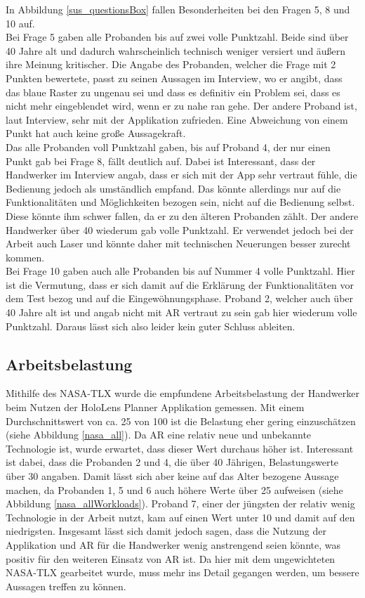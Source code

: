 In Abbildung \ref{sus_questionsBox} fallen Besonderheiten bei den Fragen 5, 8 und 10 auf. \\
Bei Frage 5 gaben alle Probanden bis auf zwei volle Punktzahl. Beide sind über 40 Jahre alt und dadurch wahrscheinlich technisch weniger versiert und äußern ihre Meinung kritischer. Die Angabe des Probanden, welcher die Frage mit 2 Punkten bewertete, passt zu seinen Aussagen im Interview, wo er angibt, dass das blaue Raster zu ungenau sei und dass es definitiv ein Problem sei, dass es nicht mehr eingeblendet wird, wenn er zu nahe ran gehe. Der andere Proband ist, laut Interview, sehr mit der Applikation zufrieden. Eine Abweichung von einem Punkt hat auch keine große Aussagekraft. \\
Das alle Probanden voll Punktzahl gaben, bis auf Proband 4, der nur einen Punkt gab bei Frage 8, fällt deutlich auf. Dabei ist Interessant, dass der Handwerker im Interview angab, dass er sich mit der App sehr vertraut fühle, die Bedienung jedoch als umständlich empfand. Das könnte allerdings nur auf die Funktionalitäten und Möglichkeiten bezogen sein, nicht auf die Bedienung selbst. Diese könnte ihm schwer fallen, da er zu den älteren Probanden zählt. Der andere Handwerker über 40 wiederum gab volle Punktzahl. Er verwendet jedoch bei der Arbeit auch Laser und könnte daher mit technischen Neuerungen besser zurecht kommen. \\
Bei Frage 10 gaben auch alle Probanden bis auf Nummer 4 volle Punktzahl. Hier ist die Vermutung, dass er sich damit auf die Erklärung der Funktionalitäten vor dem Test bezog und auf die Eingewöhnungsphase. Proband 2, welcher auch über 40 Jahre alt ist und angab nicht mit AR vertraut zu sein gab hier wiederum volle Punktzahl. Daraus lässt sich also leider kein guter Schluss ableiten.

\subsection{Arbeitsbelastung}

Mithilfe des NASA-TLX wurde die empfundene Arbeitsbelastung der Handwerker beim Nutzen der HoloLens Planner Applikation gemessen. Mit einem Durchschnittswert von ca. 25 von 100 ist die Belastung eher gering einzuschätzen (siehe Abbildung \ref{nasa_all}). Da AR eine relativ neue und unbekannte Technologie ist, wurde erwartet, dass dieser Wert durchaus höher ist. Interessant ist dabei, dass die Probanden 2 und 4, die über 40 Jährigen, Belastungswerte über 30 angaben. Damit lässt sich aber keine auf das Alter bezogene Aussage machen, da Probanden 1, 5 und 6 auch höhere Werte über 25 aufweisen (siehe Abbildung \ref{nasa_allWorkloads}). Proband 7, einer der jüngsten der relativ wenig Technologie in der Arbeit nutzt, kam auf einen Wert unter 10 und damit auf den niedrigsten. Insgesamt lässt sich damit jedoch sagen, dass die Nutzung der Applikation und AR für die Handwerker wenig anstrengend seien könnte, was positiv für den weiteren Einsatz von AR ist. Da hier mit dem ungewichteten NASA-TLX gearbeitet wurde, muss mehr ins Detail gegangen werden, um bessere Aussagen treffen zu können.

